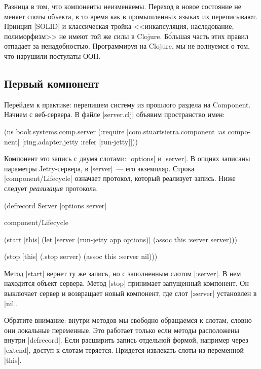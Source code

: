 Разница в том, что компоненты неизменяемы. Переход в новое состояние не меняет
слоты объекта, в то время как в промышленных языках их переписывают. Принцип
\spverb|SOLID| и классическая тройка <<инкапсуляция, наследование, полиморфизм>>
не имеют той же силы в Clojure. Б\'{о}льшая часть этих правил отпадает за
ненадобностью. Программируя на Clojure, мы не волнуемся о том, что нарушили
постулаты ООП.

\subsection{Первый компонент}

Перейдем к практике: перепишем систему из прошлого раздела на Component. Начнем
с веб-сервера. В файле \spverb|server.clj| объявим пространство имен:

\begin{english}
  \begin{clojure}
(ns book.systems.comp.server
  (:require
   [com.stuartsierra.component :as component]
   [ring.adapter.jetty :refer [run-jetty]]))
  \end{clojure}
\end{english}

Компонент это запись с двумя слотами: \spverb|options| и \spverb|server|. В
опциях записаны параметры Jetty-сервера, в \spverb|server|~--- его
экземпляр. Строка \spverb|component/Lifecycle| означает протокол, который
реализует запись. Ниже следует \emph{реализация} протокола.

\begin{english}
  \begin{clojure}
(defrecord Server [options server]

  component/Lifecycle

  (start [this]
    (let [server (run-jetty app options)]
      (assoc this :server server)))

  (stop [this]
    (.stop server)
    (assoc this :server nil)))
  \end{clojure}
\end{english}

Метод \spverb|start| вернет ту же запись, но с заполненным слотом
\spverb|:server|. В нем находится объект сервера. Метод \spverb|stop| принимает
запущенный компонент. Он выключает сервер и возвращает новый компонент, где слот
\spverb|:server| установлен в \spverb|nil|.

Обратите внимание: внутри методов мы свободно обращаемся к слотам, словно они
локальные переменные. Это работает только если методы расположены внутри
\spverb|defrecord|. Если расширить запись отдельной формой, например через
\spverb|extend|, доступ к слотам теряется. Придется извлекать слоты из
переменной \spverb|this|.

